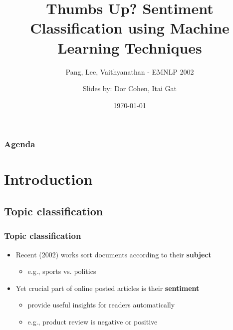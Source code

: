 \documentclass{beamer}
\title{Thumbs Up? Sentiment Classification using Machine Learning Techniques}
\subtitle{Pang, Lee, Vaithyanathan - EMNLP 2002}
\author{Slides by: Dor Cohen, Itai Gat}
\institute{IE\&M @ Technion}
\date{\today}
\begin{document}
\begin{frame}
	\titlepage
\end{frame}

\begin{frame}
	\frametitle{Agenda}
	\tableofcontents
\end{frame}

\section{Introduction}
\subsection{Topic classification}

\begin{frame}
	\frametitle{Topic classification}
	\begin{itemize}
	\item Recent (2002) works sort documents according to their \textbf{subject}
	\begin{itemize}
		\item e.g., sports vs. politics
	\end{itemize}
	\pause
	\item Yet crucial part of online posted articles is their \textbf{sentiment}
	\begin{itemize}
		\item provide useful insights for readers automatically
		\item e.g., product review is negative or positive
	\end{itemize}

	\end{itemize}
\end{frame}

\end{document}
